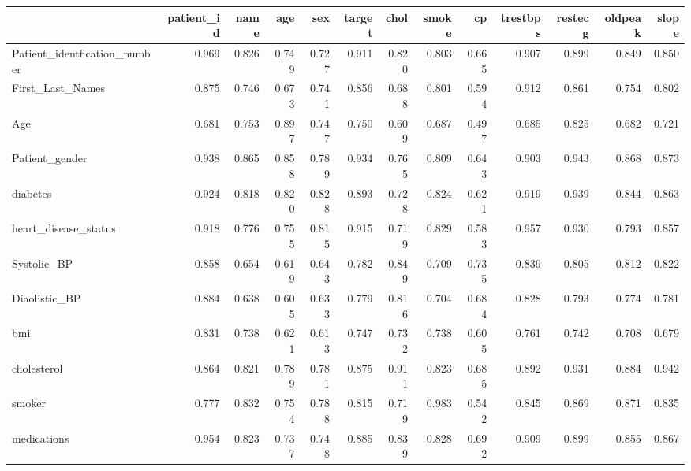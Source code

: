\begin{tabular}{lrrrrrrrrrrrr}
\toprule
 & patient_id & name & age & sex & target & chol & smoke & cp & trestbps & restecg & oldpeak & slope \\
\midrule
Patient_identfication_number & 0.969 & 0.826 & 0.749 & 0.727 & 0.911 & 0.820 & 0.803 & 0.665 & 0.907 & 0.899 & 0.849 & 0.850 \\
First_Last_Names & 0.875 & 0.746 & 0.673 & 0.741 & 0.856 & 0.688 & 0.801 & 0.594 & 0.912 & 0.861 & 0.754 & 0.802 \\
Age & 0.681 & 0.753 & 0.897 & 0.747 & 0.750 & 0.609 & 0.687 & 0.497 & 0.685 & 0.825 & 0.682 & 0.721 \\
Patient_gender & 0.938 & 0.865 & 0.858 & 0.789 & 0.934 & 0.765 & 0.809 & 0.643 & 0.903 & 0.943 & 0.868 & 0.873 \\
diabetes & 0.924 & 0.818 & 0.820 & 0.828 & 0.893 & 0.728 & 0.824 & 0.621 & 0.919 & 0.939 & 0.844 & 0.863 \\
heart_disease_status & 0.918 & 0.776 & 0.755 & 0.815 & 0.915 & 0.719 & 0.829 & 0.583 & 0.957 & 0.930 & 0.793 & 0.857 \\
Systolic_BP & 0.858 & 0.654 & 0.619 & 0.643 & 0.782 & 0.849 & 0.709 & 0.735 & 0.839 & 0.805 & 0.812 & 0.822 \\
Diaolistic_BP & 0.884 & 0.638 & 0.605 & 0.633 & 0.779 & 0.816 & 0.704 & 0.684 & 0.828 & 0.793 & 0.774 & 0.781 \\
bmi & 0.831 & 0.738 & 0.621 & 0.613 & 0.747 & 0.732 & 0.738 & 0.605 & 0.761 & 0.742 & 0.708 & 0.679 \\
cholesterol & 0.864 & 0.821 & 0.789 & 0.781 & 0.875 & 0.911 & 0.823 & 0.685 & 0.892 & 0.931 & 0.884 & 0.942 \\
smoker & 0.777 & 0.832 & 0.754 & 0.788 & 0.815 & 0.719 & 0.983 & 0.542 & 0.845 & 0.869 & 0.871 & 0.835 \\
medications & 0.954 & 0.823 & 0.737 & 0.748 & 0.885 & 0.839 & 0.828 & 0.692 & 0.909 & 0.899 & 0.855 & 0.867 \\
\bottomrule
\end{tabular}
